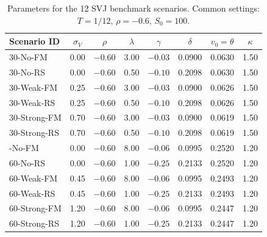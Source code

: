 \begin{table}[htbp]
\centering
\caption{Parameters for the 12 SVJ benchmark scenarios. Common settings: $T=1/12$, $\rho=-0.6$, $S_0=100$.}
\label{tab:scenarios}
\small
\begin{tabular}{lccccccc}
\toprule
Scenario ID & $\sigma_V$ & $\rho$ & $\lambda$ & $\gamma$ & $\delta$ & $v_0=\theta$ & $\kappa$ \\
\midrule
30-No-FM     & 0.00 & $-0.60$ & 3.00 & $-0.03$ & 0.0900 & 0.0630 & 1.50 \\
30-No-RS     & 0.00 & $-0.60$ & 0.50 & $-0.10$ & 0.2098 & 0.0630 & 1.50 \\
30-Weak-FM   & 0.25 & $-0.60$ & 3.00 & $-0.03$ & 0.0900 & 0.0626 & 1.50 \\
30-Weak-RS   & 0.25 & $-0.60$ & 0.50 & $-0.10$ & 0.2098 & 0.0626 & 1.50 \\
30-Strong-FM & 0.70 & $-0.60$ & 3.00 & $-0.03$ & 0.0900 & 0.0619 & 1.50 \\
30-Strong-RS & 0.70 & $-0.60$ & 0.50 & $-0.10$ & 0.2098 & 0.0619 & 1.50 \\
\addlinespace
60-No-FM     & 0.00 & $-0.60$ & 8.00 & $-0.06$ & 0.0995 & 0.2520 & 1.20 \\
60-No-RS     & 0.00 & $-0.60$ & 1.00 & $-0.25$ & 0.2133 & 0.2520 & 1.20 \\
60-Weak-FM   & 0.45 & $-0.60$ & 8.00 & $-0.06$ & 0.0995 & 0.2493 & 1.20 \\
60-Weak-RS   & 0.45 & $-0.60$ & 1.00 & $-0.25$ & 0.2133 & 0.2493 & 1.20 \\
60-Strong-FM & 1.20 & $-0.60$ & 8.00 & $-0.06$ & 0.0995 & 0.2447 & 1.20 \\
60-Strong-RS & 1.20 & $-0.60$ & 1.00 & $-0.25$ & 0.2133 & 0.2447 & 1.20 \\
\bottomrule
\end{tabular}
\end{table}
